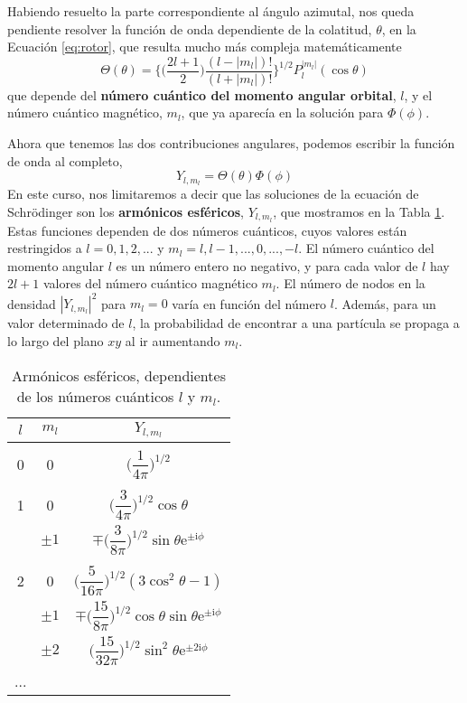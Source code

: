 \documentclass{tufte-handout}
\begin{document}
Habiendo resuelto la parte correspondiente al ángulo 
azimutal, nos queda pendiente resolver la función de onda
dependiente de la colatitud, $\theta$, en la Ecuación
\ref{eq:rotor}, que resulta mucho más compleja 
matemáticamente
\begin{equation}
    \Theta(\theta)=\bigg\{ 
    \bigg(
    \frac{2l+1}{2}
    \bigg)
    \frac{(l-|m_l|)!}{(l+|m_l|)!}
    \bigg\}^{1/2}
    P_l^{|m_l|}(\cos\theta)
\end{equation}
que depende del \textbf{número 
cuántico del momento angular orbital}, $l$, y el número
cuántico magnético, $m_l$, que ya aparecía en la solución
para $\Phi(\phi)$. 

Ahora que tenemos las dos contribuciones angulares, 
podemos escribir la función de onda al completo,
\begin{equation}
    Y_{l,m_l}=\Theta(\theta)\Phi(\phi)
\end{equation}
En este curso, nos limitaremos a decir que las 
soluciones de la ecuación de Schrödinger son los
\textbf{armónicos esféricos}, $Y_{l,m_l}$, 
que mostramos en la Tabla \ref{tb:legendre}. Estas 
funciones dependen de dos números cuánticos, cuyos 
valores están restringidos a $l=0,1,2,...$ y 
$m_l=l, l-1,...,0,...,-l$. El número cuántico del 
momento angular $l$ es un número entero no negativo, y 
para cada valor de $l$ hay $2l+1$ valores del número 
cuántico magnético $m_l$. El número de nodos en la 
densidad $|Y_{l,m_l}|^2$ para $m_l=0$ varía en función 
del número $l$. Además, para un valor determinado de $l$,
la probabilidad de encontrar a una partícula se propaga 
a lo largo del plano $xy$ al ir aumentando $m_l$.

\begin{table}[t!]
    \centering
    \begin{tabular}{c|c|c}
     $l$ & $m_l$ & $ Y_{l,m_l}$ \\
     \hline
     & & \\
    0 & 0       & $\bigg(\dfrac{1}{4\pi}\bigg)^{1/2}$\\ 
     & & \\
    1 & 0       & $\bigg(\dfrac{3}{4\pi}\bigg)^{1/2}\cos{\theta}$ \\ 
      & $\pm 1$ & $\mp\bigg(\dfrac{3}{8\pi}\bigg)^{1/2}\sin{\theta}\mathrm{e}^{\pm \mathrm{i}\phi}$ \\ 
     & & \\
    2 & 0       & $\bigg(\dfrac{5}{16\pi}\bigg)^{1/2}(3\cos^2\theta-1)$ \\ 
      & $\pm 1$  & $\mp\bigg(\dfrac{15}{8\pi}\bigg)^{1/2}\cos\theta\sin\theta\mathrm{e}^{\pm \mathrm{i}\phi}$  \\ 
      & $\pm 2$  & $\bigg(\dfrac{15}{32\pi}\bigg)^{1/2}\sin^2\theta\mathrm{e}^{\pm 2\mathrm{i}\phi}$ \\ 
    ... &  &
    \end{tabular}
    \caption{Armónicos esféricos, dependientes de los números
    cuánticos $l$ y $m_l$.}
    \label{tb:legendre}
\end{table}
\end{document}
